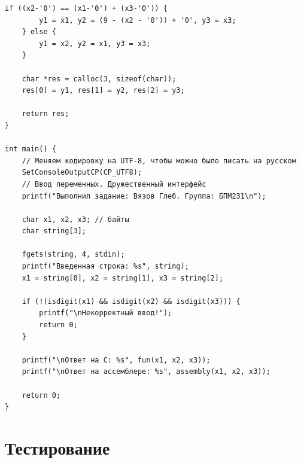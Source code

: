 \documentclass[12pt]{article}
\begin{document}
\begin{lstlisting}[label=string_code1,caption=C]
    if ((x2-'0') == (x1-'0') + (x3-'0')) {
        y1 = x1, y2 = (9 - (x2 - '0')) + '0', y3 = x3;
    } else {
        y1 = x2, y2 = x1, y3 = x3;
    }

    char *res = calloc(3, sizeof(char));
    res[0] = y1, res[1] = y2, res[2] = y3;

    return res;
}

int main() {
    // Меняем кодировку на UTF-8, чтобы можно было писать на русском
    SetConsoleOutputCP(CP_UTF8);
    // Ввод переменных. Дружественный интерфейс
    printf("Выполнил задание: Вязов Глеб. Группа: БПМ231\n");

    char x1, x2, x3; // байты
    char string[3];

    fgets(string, 4, stdin);
    printf("Введенная строка: %s", string);
    x1 = string[0], x2 = string[1], x3 = string[2];

    if (!(isdigit(x1) && isdigit(x2) && isdigit(x3))) {
        printf("\nНекорректный ввод!");
        return 0;
    }

    printf("\nОтвет на C: %s", fun(x1, x2, x3));
    printf("\nОтвет на ассемблере: %s", assembly(x1, x2, x3));

    return 0;
}
\end{lstlisting} 

\section*{Тестирование}
\end{document}
